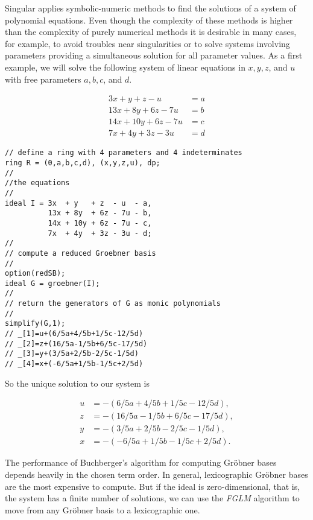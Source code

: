 \documentclass[12pt]{amsart}
\begin{document}
Singular applies symbolic-numeric methods to find the solutions of a system of polynomial equations. 
Even though the complexity of these methods is higher than the complexity of purely numerical methods 
it is desirable in many 
cases, for example, to avoid troubles near singularities or to solve systems involving parameters providing
a simultaneous solution for all parameter values. As a first example, we will solve the following 
system of linear equations in $x,y,z$, and $u$ with free parameters $a,b,c$, and $d$.  

\begin{align*}
3x  + y   + z  - u  &= a\\
13x + 8y  + 6z - 7u &= b\\
14x + 10y + 6z - 7u &= c\\ 
7x  + 4y  + 3z - 3u &= d
\end{align*}

\begin{verbatim}
// define a ring with 4 parameters and 4 indeterminates
ring R = (0,a,b,c,d), (x,y,z,u), dp;
//
//the equations
//
ideal I = 3x  + y   + z  - u  - a,
          13x + 8y  + 6z - 7u - b,
          14x + 10y + 6z - 7u - c,
          7x  + 4y  + 3z - 3u - d;
//
// compute a reduced Groebner basis
//
option(redSB);
ideal G = groebner(I);
//
// return the generators of G as monic polynomials
//
simplify(G,1);
// _[1]=u+(6/5a+4/5b+1/5c-12/5d)
// _[2]=z+(16/5a-1/5b+6/5c-17/5d)
// _[3]=y+(3/5a+2/5b-2/5c-1/5d)
// _[4]=x+(-6/5a+1/5b-1/5c+2/5d) 
\end{verbatim}

So the unique solution to our system is

\begin{align*}
u &= -(6/5a+4/5b+1/5c-12/5d),\\
z &= -(16/5a-1/5b+6/5c-17/5d),\\
y &= -(3/5a+2/5b-2/5c-1/5d),\\
x &= -(-6/5a+1/5b-1/5c+2/5d).
\end{align*}


The performance of Buchberger's algorithm for computing Gr\"obner bases depends
heavily in the chosen term order. In general, lexicographic Gr\"obner bases are the
most expensive to compute. But if the ideal is zero-dimensional, that is, 
the system has a finite number of solutions, we can use the \emph{FGLM} algorithm
to move from any Gr\"obner basis to a lexicographic one. 
\end{document}
